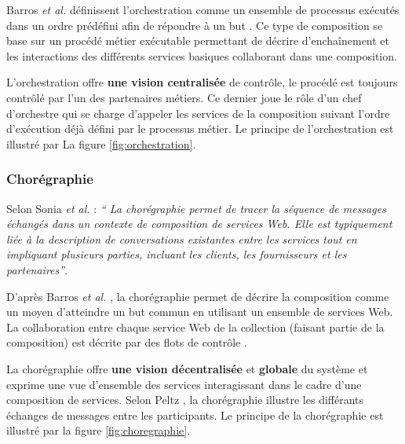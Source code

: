       Barros \emph{et al.} \cite{barros2006standards} définissent
      l'orchestration comme un ensemble de processus exécutés dans un
      ordre prédéfini afin de répondre à un but
      \cite{lopez2008selection}. Ce type de composition se base sur un
      procédé métier exécutable permettant de décrire d'enchaînement
      et les interactions des différents services basiques collaborant
      dans une composition.
      
      L'orchestration offre \textbf{une vision centralisée} de
      contrôle, le procédé est toujours contrôlé par l'un des
      partenaires métiers. Ce dernier joue le rôle d'un chef
      d'orchestre qui se charge d'appeler les services de la
      composition suivant l'ordre d'exécution déjà défini par le
      processus métier. Le principe de l'orchestration est illustré
      par La figure \ref{fig:orchestration}.

      \subsubsection{Chorégraphie}
      \label{sec:choregraphie-sec}
      Selon Sonia \emph{et al.} \cite{jamal2005environnement} :
      \emph{`` La chorégraphie permet de tracer la séquence de
        messages échangés dans un contexte de composition de services
        Web. Elle est typiquement liée à la description de
        conversations existantes entre les services tout en impliquant
        plusieurs parties, incluant les clients, les fournisseurs et
        les partenaires''}.

      D'après Barros \emph{et al.} \cite{barros2006standards}, la
      chorégraphie permet de décrire la composition comme un moyen
      d'atteindre un but commun en utilisant un ensemble de services
      Web. La collaboration entre chaque service Web de la collection
      (faisant partie de la composition) est décrite par des flots de
      contrôle \cite{lopez2008selection}.

      La chorégraphie offre \textbf{une vision décentralisée} et
      \textbf{globale} du système et exprime une vue d'ensemble des
      services interagissant dans le cadre d'une composition de
      services. Selon Peltz \cite{peltz2003web}, la chorégraphie
      illustre les différants échanges de messages entre les
      participants. Le principe de la chorégraphie est illustré par la
      figure \ref{fig:choregraphie}.

